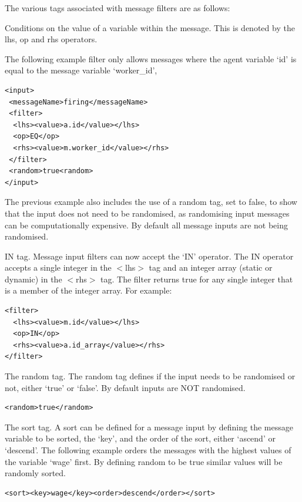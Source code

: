 \documentclass[a4paper,11pt]{article}
\newenvironment{mylisting}
{\begin{list}{}{\setlength{\leftmargin}{1em}}\item\small\bfseries}
{\end{list}}
\begin{document}
The various tags associated with message filters are as follows:
\begin{itemize}
\item Conditions on the value of a variable within the message. This
is denoted by the lhs, op and rhs operators.

The following example filter only allows messages where the agent
variable `id' is equal to the message variable `worker\_id',

\begin{mylisting}
\begin{verbatim}
<input>
 <messageName>firing</messageName>
 <filter>
  <lhs><value>a.id</value></lhs>
  <op>EQ</op>
  <rhs><value>m.worker_id</value></rhs>
 </filter>
 <random>true<random>
</input>
\end{verbatim}
\end{mylisting}

The previous example also includes the use of a random tag, set to
false, to show that the input does not need to be randomised, as
randomising input messages can be computationally expensive. By
default all message inputs are not being randomised.

\item IN tag. Message input filters can now accept the `IN' operator.
The IN operator accepts a single integer in the $<$lhs$>$ tag and an
integer array (static or dynamic) in the $<$rhs$>$ tag. The filter
returns true for any single integer that is a member of the integer
array. For example:
\begin{mylisting}
\begin{verbatim}
<filter>
  <lhs><value>m.id</value></lhs>
  <op>IN</op>
  <rhs><value>a.id_array</value></rhs>
</filter>
\end{verbatim}
\end{mylisting}
\item The random tag. The random tag defines if the input needs to be randomised or not, either `true' or
`false'. By default inputs are NOT randomised.
\begin{mylisting}
\begin{verbatim}
<random>true</random>
\end{verbatim}
\end{mylisting}
\item The sort tag. A sort can be defined for a message input by defining the message variable to be sorted, the `key',
and the order of the sort, either `ascend' or `descend'. The
following example orders the messages with the highest values of the
variable `wage' first. By defining random to be true similar values
will be randomly sorted.
\begin{mylisting}
\begin{verbatim}
<sort><key>wage</key><order>descend</order></sort>
\end{verbatim}
\end{mylisting}


\end{itemize}
\end{document}
